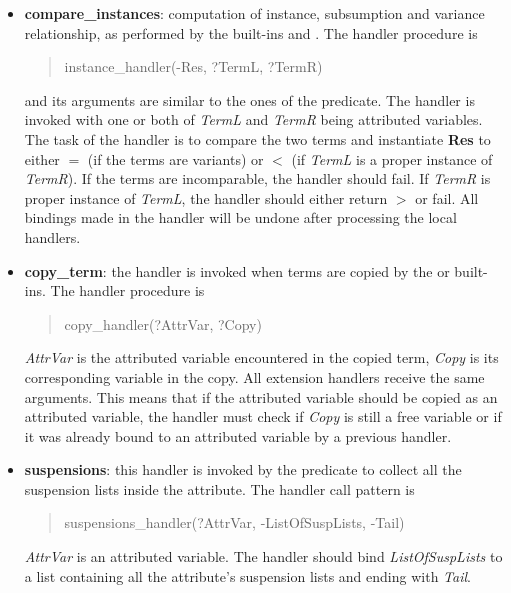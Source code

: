\begin{itemize}
\item {\bf compare_instances}: computation of instance, subsumption
and variance relationship, as performed by the built-ins
 and
.
The handler procedure is
\begin{quote}
instance_handler(-Res, ?TermL, ?TermR)
\end{quote}
and its arguments are similar to the ones of the
predicate.
The handler is invoked with one or both of {\it TermL} and {\it TermR} being
attributed variables. The task of the handler is to compare the two terms
and instantiate {\bf Res} to either $=$ (if the terms are variants) or $<$
(if {\it TermL} is a proper instance of {\it TermR}). If the terms are
incomparable, the handler should fail. If {\it TermR} is proper instance
of {\it TermL}, the handler should either return $>$ or fail.
All bindings made in the handler will be undone after processing
the local handlers.

\item {\bf copy_term}: the handler is invoked when terms are copied by the
 or
 built-ins.
The handler procedure is
\begin{quote}
copy_handler(?AttrVar, ?Copy)
\end{quote}
{\it AttrVar} is the attributed variable encountered in the
copied term, {\it Copy} is its corresponding variable in the copy.
All extension handlers receive the same arguments.
This means that if the attributed variable should be copied as
an attributed variable, the handler must check if {\it Copy} is still
a free variable or if it was already bound to an attributed variable by a previous handler.

\item {\bf suspensions}: this handler is invoked by the
 predicate
to collect all the suspension lists inside the attribute.
The handler call pattern is
\begin{quote}
suspensions_handler(?AttrVar, -ListOfSuspLists, -Tail)
\end{quote}
{\it AttrVar} is an attributed variable. The handler should bind
{\it ListOfSuspLists} to a list containing all the attribute's
suspension lists and ending with {\it Tail}.



\end{itemize}
